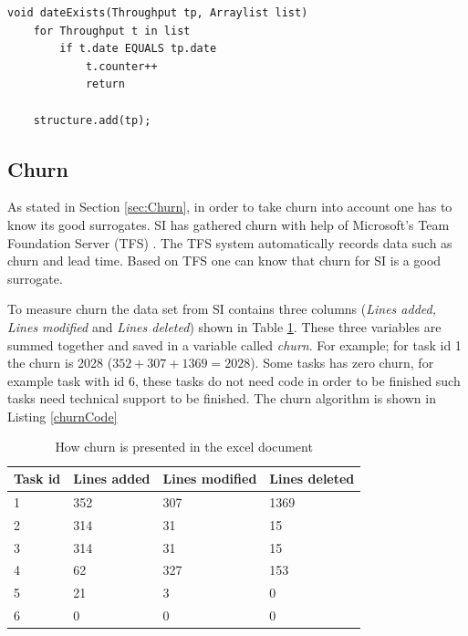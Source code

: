 \documentclass[UKenglish]{ifimaster}  %
\begin{document}
\begin{minipage}{\textwidth}
\begin{lstlisting}[caption=Pseudocode example of how throughput is measured, label=throughputCode]
void dateExists(Throughput tp, Arraylist list)
	for Throughput t in list
		if t.date EQUALS tp.date
			t.counter++
			return
			
	structure.add(tp);
\end{lstlisting}
 \end{minipage}


\subsection{Churn}
\label{sec:churn}
As stated in Section \ref{sec:Churn}, in order to take churn into account one has to know its good surrogates. SI has gathered churn with help of Microsoft's Team Foundation Server (TFS) \parencite{Dag}. The TFS system automatically records data such as churn and lead time. Based on TFS one can know that churn for SI is a good surrogate.

To measure churn the data set from SI contains three columns (\textit{Lines added, Lines modified} and \textit{Lines deleted}) shown in Table \ref{table:churn}. These three variables are summed together and saved in a  variable called \textit{churn}.  For example; for task id 1 the churn is 2028 ($352+307+1369 = 2028$). Some tasks has zero churn, for example task with id 6, these tasks do not need code in order to be finished such tasks need technical support to be finished. The churn algorithm is shown in Listing \ref{churnCode}

\begin{table}[!ht]
\begin{center}
    \begin{tabular}{| l | l | l | l |}
    \hline
\bf{Task id} & \bf{Lines added} & \bf{Lines modified}  & \bf{Lines deleted} \\ \hline
1&352&307&1369\\ \hline
2&314 & 31 & 15 \\ \hline
3&314&31 & 15\\ \hline
4&62&327&153 \\ \hline
5&21&3&0 \\ \hline
6&0&0&0 \\ \hline
\end{tabular}
\caption{How churn is presented in the excel document}
\label{table:churn} %
\end{center}
\end{table}
\end{document}
